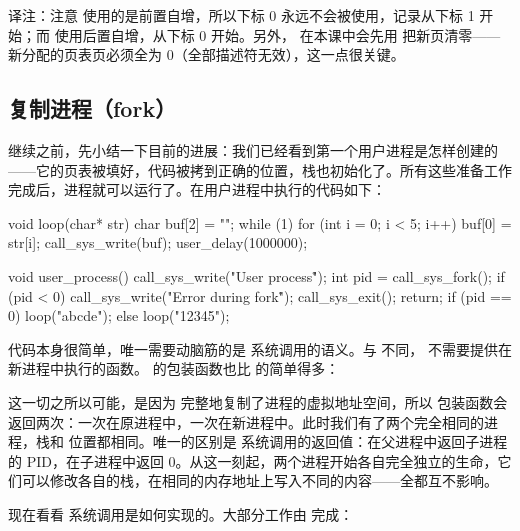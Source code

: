 \begin{remark}
  译注：注意  使用的是前置自增，所以下标 0 永远不会被使用，记录从下标 1 开始；而  使用后置自增，从下标 0 开始。另外， 在本课中会先用  把新页清零——新分配的页表页必须全为 0（全部描述符无效），这一点很关键。
\end{remark}

\subsection{复制进程（fork）}

继续之前，先小结一下目前的进展：我们已经看到第一个用户进程是怎样创建的——它的页表被填好，代码被拷到正确的位置，栈也初始化了。所有这些准备工作完成后，进程就可以运行了。在用户进程中执行的代码如下：

\begin{ccode}
void loop(char* str)
{
	char buf[2] = {""};
	while (1){
		for (int i = 0; i < 5; i++){
			buf[0] = str[i];
			call_sys_write(buf);
			user_delay(1000000);
		}
	}
}

void user_process()
{
	call_sys_write("User process\n\r");
	int pid = call_sys_fork();
	if (pid < 0) {
		call_sys_write("Error during fork\n\r");
		call_sys_exit();
		return;
	}
	if (pid == 0){
		loop("abcde");
	} else {
		loop("12345");
	}
}
\end{ccode}

代码本身很简单，唯一需要动脑筋的是  系统调用的语义。与  不同， 不需要提供在新进程中执行的函数。 的包装函数也比  的简单得多：


这一切之所以可能，是因为  完整地复制了进程的虚拟地址空间，所以  包装函数会返回两次：一次在原进程中，一次在新进程中。此时我们有了两个完全相同的进程，栈和  位置都相同。唯一的区别是  系统调用的返回值：在父进程中返回子进程的 PID，在子进程中返回 0。从这一刻起，两个进程开始各自完全独立的生命，它们可以修改各自的栈，在相同的内存地址上写入不同的内容——全都互不影响。

现在看看  系统调用是如何实现的。大部分工作由  完成：


